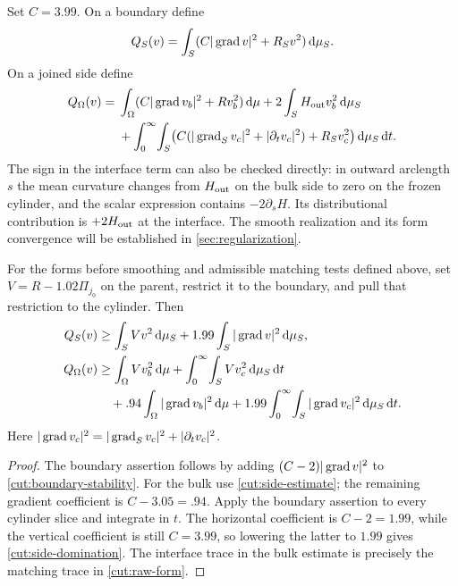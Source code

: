 Set $C=3.99$.  On a boundary define
\[
 Q_S(v)=\int_S(C|\operatorname{grad} v|^2+R_Sv^2)\,\mathrm d\mu_S.
\]
On a joined side define
\begin{align}\label{cut:raw-form}
 Q_\Omega(v)
  ={}&\int_\Omega(C|\operatorname{grad} v_b|^2+Rv_b^2)\,\mathrm d\mu
       +2\int_S H_{\rm out}v_b^2\,\mathrm d\mu_S\notag\\
    &+\int_0^\infty\!\int_S
        \bigl(C(|\operatorname{grad}_Sv_c|^2+|\partial_tv_c|^2)
                         +R_Sv_c^2\bigr)\,\mathrm d\mu_S\,\mathrm d t.
\end{align}
The sign in the interface term can also be checked directly: in outward
arclength $s$ the mean curvature changes from $H_{\rm out}$ on the
bulk side to zero on the frozen cylinder, and the scalar expression
contains $-2\partial_sH$.  Its distributional contribution is
$+2H_{\rm out}$ at the interface.  The smooth realization and its form
convergence will be established in \cref{sec:regularization}.

\begin{proposition}\label{cut:raw-domination}
For the forms before smoothing and admissible matching tests defined above, set
$V=R-1.02\Pi_{j_0}$ on the parent, restrict it to the boundary, and pull
that restriction to the cylinder. Then
\begin{align}\label{cut:boundary-domination}
 Q_S(v)&\ge\int_S Vv^2\,\mathrm d\mu_S
                    +1.99\int_S|\operatorname{grad} v|^2\,\mathrm d\mu_S,\\
 Q_\Omega(v)&\ge\int_\Omega Vv_b^2\,\mathrm d\mu
       +\int_0^\infty\!\int_S Vv_c^2\,\mathrm d\mu_S\,\mathrm d t\notag\\
 &\quad+.94\int_\Omega|\operatorname{grad} v_b|^2\,\mathrm d\mu
       +1.99\int_0^\infty\!\int_S|\operatorname{grad} v_c|^2
                                      \,\mathrm d\mu_S\,\mathrm d t.
                                      \label{cut:side-domination}
\end{align}
Here $|\operatorname{grad} v_c|^2=|\operatorname{grad}_Sv_c|^2+|\partial_tv_c|^2$.
\end{proposition}

\begin{proof}
The boundary assertion follows by adding $(C-2)|\operatorname{grad} v|^2$ to
\cref{cut:boundary-stability}.  For the bulk use
\cref{cut:side-estimate}; the remaining gradient coefficient is
$C-3.05=.94$.  Apply the boundary assertion to every cylinder slice and
integrate in $t$.  The horizontal coefficient is $C-2=1.99$, while the
vertical coefficient is still $C=3.99$, so lowering the latter to $1.99$
gives \eqref{cut:side-domination}.  The interface trace in the bulk estimate
is precisely the matching trace in \eqref{cut:raw-form}.
\end{proof}

